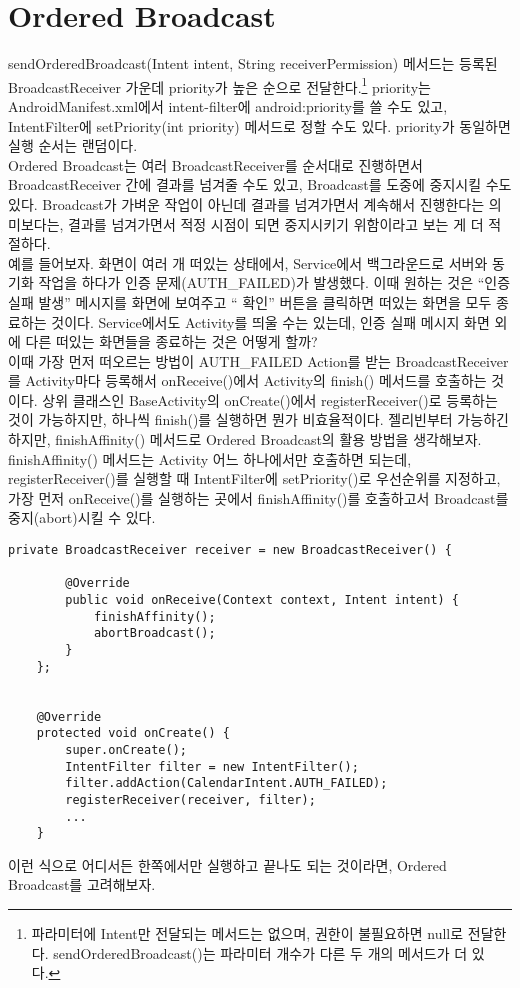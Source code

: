 \section{Ordered Broadcast}
sendOrderedBroadcast(Intent intent, String receiverPermission) 메서드는 등록된 BroadcastReceiver 가운데 priority가 높은 순으로 전달한다.\footnote{파라미터에 Intent만 전달되는 메서드는 없으며, 권한이 불필요하면 null로 전달한다. sendOrderedBroadcast()는 파라미터 개수가 다른 두 개의 메서드가 더 있다.}
priority는 AndroidManifest.xml에서 intent-filter에 android:priority를 쓸 수도 있고, IntentFilter에 setPriority(int priority) 메서드로 정할 수도 있다. priority가 동일하면 실행 순서는 랜덤이다.\\

Ordered Broadcast는 여러 BroadcastReceiver를 순서대로 진행하면서  BroadcastReceiver 간에 결과를 넘겨줄 수도 있고, Broadcast를 도중에 중지시킬 수도 있다. Broadcast가 가벼운 작업이 아닌데 결과를 넘겨가면서 계속해서 진행한다는 의미보다는, 결과를 넘겨가면서 적정 시점이 되면 중지시키기 위함이라고 보는 게 더 적절하다.\\

예를 들어보자. 화면이 여러 개 떠있는 상태에서, Service에서 백그라운드로 서버와 동기화 작업을 하다가 인증 문제(AUTH\_FAILED)가 발생했다. 이때 원하는 것은 ``인증 실패 발생'' 메시지를 화면에 보여주고 `` 확인'' 버튼을 클릭하면 떠있는 화면을 모두 종료하는 것이다.
Service에서도 Activity를 띄울 수는 있는데, 인증 실패 메시지 화면 외에 다른 떠있는 화면들을 종료하는 것은 어떻게 할까?\\

이때 가장 먼저 떠오르는 방법이 AUTH\_FAILED Action를 받는 BroadcastReceiver를 Activity마다 등록해서 onReceive()에서 Activity의 finish() 메서드를 호출하는 것이다.
상위 클래스인 BaseActivity의 onCreate()에서 registerReceiver()로 등록하는 것이 가능하지만, 하나씩 finish()를 실행하면 뭔가 비효율적이다. 젤리빈부터 가능하긴 하지만, finishAffinity() 메서드로 Ordered Broadcast의 활용 방법을 생각해보자.\\

finishAffinity() 메서드는 Activity 어느 하나에서만 호출하면 되는데, registerReceiver()를 실행할 때 IntentFilter에 setPriority()로 우선순위를 지정하고, 가장 먼저 onReceive()를 실행하는 곳에서 finishAffinity()를 호출하고서 Broadcast를 중지(abort)시킬 수 있다.

\begin{lstlisting}[frame=single] 
	private BroadcastReceiver receiver = new BroadcastReceiver() {
		
		@Override
		public void onReceive(Context context, Intent intent) {
			finishAffinity();
			abortBroadcast();
		}
	};
	

	@Override
	protected void onCreate() {
		super.onCreate();
		IntentFilter filter = new IntentFilter();
		filter.addAction(CalendarIntent.AUTH_FAILED);
		registerReceiver(receiver, filter);
		...
	}
\end{lstlisting}
이런 식으로 어디서든 한쪽에서만 실행하고 끝나도 되는 것이라면, Ordered Broadcast를 고려해보자.\\

